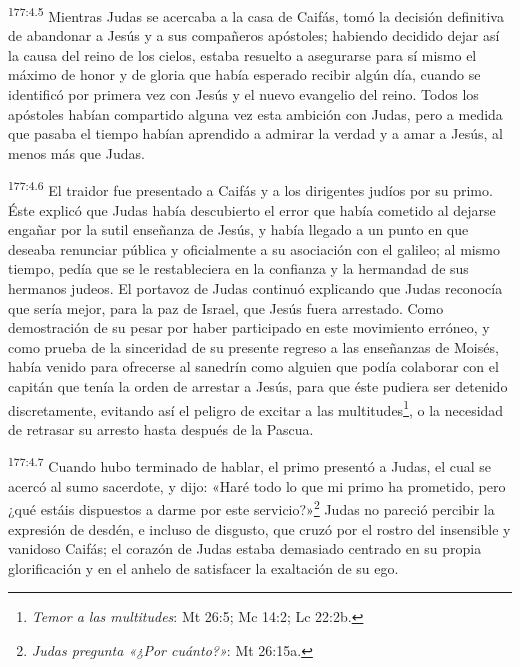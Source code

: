 \par
\textsuperscript{177:4.5} Mientras Judas se acercaba a la casa de Caifás, tomó la decisión definitiva de abandonar a Jesús y a sus compañeros apóstoles; habiendo decidido dejar así la causa del reino de los cielos, estaba resuelto a asegurarse para sí mismo el máximo de honor y de gloria que había esperado recibir algún día, cuando se identificó por primera vez con Jesús y el nuevo evangelio del reino. Todos los apóstoles habían compartido alguna vez esta ambición con Judas, pero a medida que pasaba el tiempo habían aprendido a admirar la verdad y a amar a Jesús, al menos más que Judas.

\par
\textsuperscript{177:4.6} El traidor fue presentado a Caifás y a los dirigentes judíos por su primo. Éste explicó que Judas había descubierto el error que había cometido al dejarse engañar por la sutil enseñanza de Jesús, y había llegado a un punto en que deseaba renunciar pública y oficialmente a su asociación con el galileo; al mismo tiempo, pedía que se le restableciera en la confianza y la hermandad de sus hermanos judeos. El portavoz de Judas continuó explicando que Judas reconocía que sería mejor, para la paz de Israel, que Jesús fuera arrestado. Como demostración de su pesar por haber participado en este movimiento erróneo, y como prueba de la sinceridad de su presente regreso a las enseñanzas de Moisés, había venido para ofrecerse al sanedrín como alguien que podía colaborar con el capitán que tenía la orden de arrestar a Jesús, para que éste pudiera ser detenido discretamente, evitando así el peligro de excitar a las multitudes\footnote{\textit{Temor a las multitudes}: Mt 26:5; Mc 14:2; Lc 22:2b.}, o la necesidad de retrasar su arresto hasta después de la Pascua.

\par
\textsuperscript{177:4.7} Cuando hubo terminado de hablar, el primo presentó a Judas, el cual se acercó al sumo sacerdote, y dijo: «Haré todo lo que mi primo ha prometido, pero ¿qué estáis dispuestos a darme por este servicio?»\footnote{\textit{Judas pregunta «¿Por cuánto?»}: Mt 26:15a.} Judas no pareció percibir la expresión de desdén, e incluso de disgusto, que cruzó por el rostro del insensible y vanidoso Caifás; el corazón de Judas estaba demasiado centrado en su propia glorificación y en el anhelo de satisfacer la exaltación de su ego.

